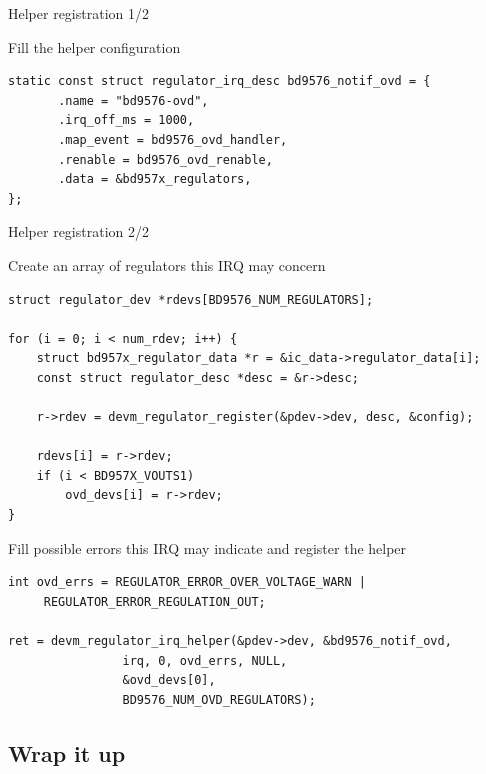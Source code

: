 \documentclass[10pt]{beamer}
\begin{document}

\begin{frame}[fragile]{Helper registration 1/2}
\lstset{language=C}
\scriptsize

Fill the helper configuration
\pause
\begin{lstlisting}
static const struct regulator_irq_desc bd9576_notif_ovd = {              
       .name = "bd9576-ovd",                                            
       .irq_off_ms = 1000,                                              
       .map_event = bd9576_ovd_handler,                                 
       .renable = bd9576_ovd_renable,                                   
       .data = &bd957x_regulators,                                      
}; 
\end{lstlisting}
\end{frame}

\begin{frame}[fragile]{Helper registration 2/2}
\lstset{language=C}
\scriptsize

Create an array of regulators this IRQ may concern
\pause
\begin{lstlisting}
struct regulator_dev *rdevs[BD9576_NUM_REGULATORS];

for (i = 0; i < num_rdev; i++) {
	struct bd957x_regulator_data *r = &ic_data->regulator_data[i];
	const struct regulator_desc *desc = &r->desc;

	r->rdev = devm_regulator_register(&pdev->dev, desc, &config);

	rdevs[i] = r->rdev;
	if (i < BD957X_VOUTS1)
		ovd_devs[i] = r->rdev;
}
\end{lstlisting}
\pause
Fill possible errors this IRQ may indicate and register the helper
\pause
\begin{lstlisting}
int ovd_errs = REGULATOR_ERROR_OVER_VOLTAGE_WARN |
	 REGULATOR_ERROR_REGULATION_OUT;

ret = devm_regulator_irq_helper(&pdev->dev, &bd9576_notif_ovd,
				irq, 0, ovd_errs, NULL,
				&ovd_devs[0],
				BD9576_NUM_OVD_REGULATORS);

\end{lstlisting}
\end{frame}


\addtocounter{framenumber}{-1}
\begin{frame}[plain]
\section{Wrap it up}
\end{frame}
\end{document}
